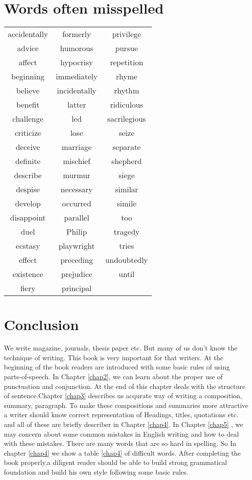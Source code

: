 \documentclass{report}
\begin{document}
\chapter{\color{blue}Words often misspelled}
\label{chap6}
	\begin{table}[h]
	\centering
	\begin{tabular}{|c|c|c|}
		\hline
		accidentally & formerly & privilege\\
		advice & humorous & pursue\\
		affect & hypocrisy & repetition\\
		beginning & immediately & rhyme\\
		believe & incidentally & rhythm\\
		benefit & latter & ridiculous\\
		challenge & led & sacrilegious\\
		criticize & lose & seize\\
		deceive & marriage & separate\\
		definite & mischief & shepherd\\
		describe & murmur & siege\\
		despise & necessary & similar\\
		develop & occurred & simile\\
		disappoint & parallel & too\\
		duel & Philip & tragedy\\
		ecstasy & playwright & tries\\
		effect & preceding & undoubtedly\\
		existence & prejudice & until\\
		fiery & principal &\\
		\hline	
	\end{tabular}
\end{table}

\chapter{\color{blue}Conclusion}
\label{chap7}
We write magazine, journals, thesis paper etc. But many of us don’t know the technique of writing. This book is very important for that writers. At the beginning of the book readers are introduced with some basic rules of using parts-of-speech. In Chapter \ref{chap2}, we can learn about the proper use of punctuation and conjunction. At the end of this chapter deals with the structure of sentence.Chapter \ref{chap3} describes us acqurate way of writing a composition, summary, paragraph. To make these compositions and summaries more attractive a writer should know correct representation of Headings, titles, quotations etc. and all of these are briefly describer in Chapter \ref{chap4}. In Chapter \ref{chap5} , we may concern about some common mistakes in English writing and how to deal with these mistakes. There are many words that are so hard in spelling. So In chapter \ref{chap4} we show a table \ref{chap4} of difficult words. After completing the book properly,a diligent reader should be able to build strong grammatical foundation and build his own style following some basic rules.
\end{document}
